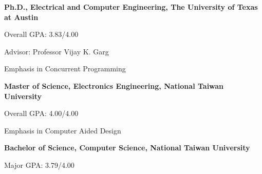 

\begin{myexp}
\item \textbf{Ph.D., Electrical and Computer Engineering, The
    University of Texas at Austin}   
   \begin{myexp}
   \item Overall GPA: 3.83/4.00  
   \item Advisor: Professor Vijay K. Garg
   \item Emphasis in Concurrent Programming
   \end{myexp}
\item \textbf{Master of Science, Electronics Engineering, National Taiwan University}  
   \begin{myexp}
   \item Overall GPA: 4.00/4.00
   \item Emphasis in Computer Aided Design

   \end{myexp}
\item \textbf{Bachelor of Science, Computer Science, National Taiwan University}  
   \begin{myexp}
   \item Major GPA: 3.79/4.00 
   \end{myexp}
\end{myexp}

